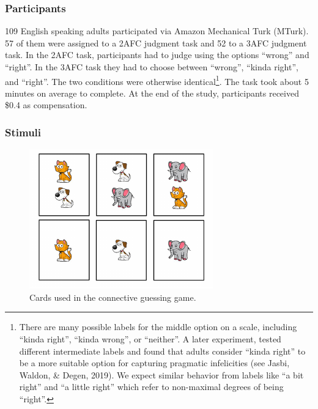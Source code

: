 \documentclass[floatsintext,man]{apa6}
\theoremstyle{definition}
\theoremstyle{definition}
\theoremstyle{definition}
\theoremstyle{remark}
\begin{document}
\subsubsection{Participants}\label{participants}

109 English speaking adults participated via Amazon Mechanical Turk
(MTurk). 57 of them were assigned to a 2AFC judgment task and 52 to a
3AFC judgment task. In the 2AFC task, participants had to judge using
the options \enquote{wrong} and \enquote{right}. In the 3AFC task they
had to choose between \enquote{wrong}, \enquote{kinda right}, and
\enquote{right}. The two conditions were otherwise identical\footnote{There
  are many possible labels for the middle option on a scale, including
  \enquote{kinda right}, \enquote{kinda wrong}, or \enquote{neither}. A
  later experiment, tested different intermediate labels and found that
  adults consider \enquote{kinda right} to be a more suitable option for
  capturing pragmatic infelicities (see Jasbi, Waldon, \& Degen, 2019).
  We expect similar behavior from labels like \enquote{a bit right} and
  \enquote{a little right} which refer to non-maximal degrees of being
  \enquote{right}.}. The task took about 5 minutes on average to
complete. At the end of the study, participants received \$0.4 as
compensation.

\subsubsection{Stimuli}\label{stimuli}

\begin{figure}[!h]

{\centering \includegraphics{figs/stimuli-1} 

}

\caption{Cards used in the connective guessing game.}\label{fig:stimuli}
\end{figure}
\end{document}
